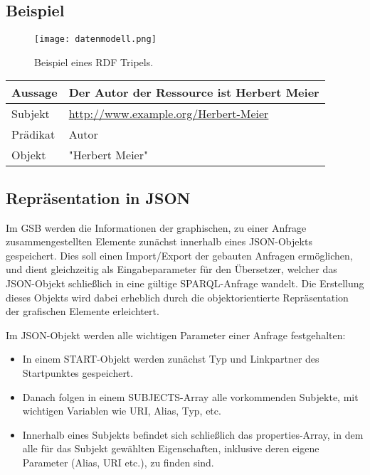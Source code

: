 \subsection*{Beispiel}
\Hack{\enlargethispage{\baselineskip}}
\begin{SCfigure}[20][htbp]%
\texttt{[image: datenmodell.png]}
\caption{Beispiel eines RDF Tripels.}\label{fig03}
\end{SCfigure}
\begin{center}

\begin{tabular}{l l}\toprule
Aussage  & Der Autor der Ressource ist Herbert Meier \\\midrule
Subjekt  & \url{http://www.example.org/Herbert-Meier} \\
Prädikat & Autor \\
Objekt   & "Herbert Meier" \\\bottomrule
\end{tabular}
\end{center}



\subsection*{Repräsentation in JSON}

Im GSB werden die Informationen der graphischen, zu einer Anfrage
zusammengestellten Elemente zunächst innerhalb eines JSON-Objekts
gespeichert.
Dies soll einen Import/Export der gebauten Anfragen ermöglichen, und
dient gleichzeitig als Eingabeparameter für den Übersetzer, welcher
das JSON-Objekt schließlich in eine gültige SPARQL-Anfrage wandelt.
Die Erstellung dieses Objekts wird dabei erheblich durch die objektorientierte Repräsentation der grafischen Elemente erleichtert.

Im JSON-Objekt werden alle wichtigen Parameter einer Anfrage
festgehalten:
\begin{itemize}
\item In einem START-Objekt werden zunächst Typ und Linkpartner des
Startpunktes gespeichert. 
\item Danach folgen in einem SUBJECTS-Array alle vorkommenden
  Subjekte, mit wichtigen Variablen wie URI, Alias, Typ, etc. 
\item Innerhalb eines Subjekts befindet sich schließlich das properties-Array, in dem alle für das Subjekt gewählten Eigenschaften, inklusive deren eigene Parameter (Alias, URI etc.), zu finden sind.
\end{itemize}


